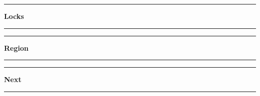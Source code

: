 \begin{center}\rule{4cm}{0.4pt}  \textbf{Locks}  \rule{4cm}{0.4pt}\end{center}
\label{inv::full:lock}
\small{}

\normalsize{}


\begin{center}\rule{4cm}{0.4pt}  \textbf{Region}  \rule{4cm}{0.4pt}\end{center}
\label{inv::full:region}
\small{}

\normalsize{}


\begin{center}\rule{4cm}{0.4pt}  \textbf{Next}  \rule{4cm}{0.4pt}\end{center}
\label{inv::full:next}
\small{}

\normalsize{}


